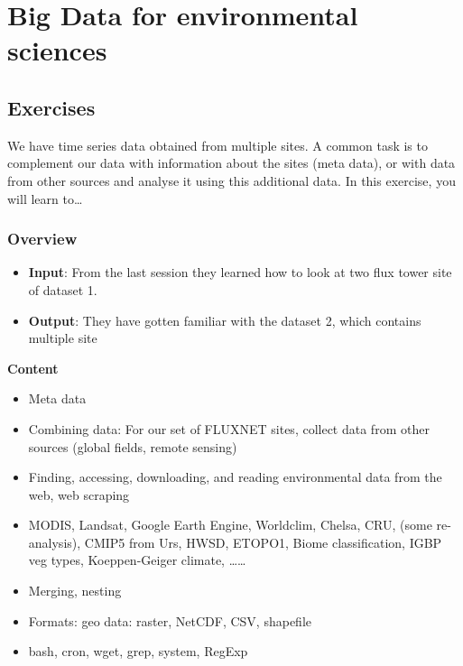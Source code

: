 \documentclass[]{book}
\providecommand{\tightlist}{%
  \setlength{\itemsep}{0pt}\setlength{\parskip}{0pt}}
\begin{document}
\hypertarget{big-data-for-environmental-sciences}{%
\chapter{Big Data for environmental sciences}\label{big-data-for-environmental-sciences}}

\hypertarget{exercises-1}{%
\section{Exercises}\label{exercises-1}}

We have time series data obtained from multiple sites. A common task is to complement our data with information about the sites (meta data), or with data from other sources and analyse it using this additional data. In this exercise, you will learn to\ldots{}

\hypertarget{overview-1}{%
\subsection{Overview}\label{overview-1}}

\begin{itemize}
\tightlist
\item
  \textbf{Input}: From the last session they learned how to look at two flux tower site of dataset 1.\\
\item
  \textbf{Output}: They have gotten familiar with the dataset 2, which contains multiple site
\end{itemize}

\textbf{Content}

\begin{itemize}
\tightlist
\item
  Meta data
\item
  Combining data: For our set of FLUXNET sites, collect data from other sources (global fields, remote sensing)
\item
  Finding, accessing, downloading, and reading environmental data from the web, web scraping
\item
  MODIS, Landsat, Google Earth Engine, Worldclim, Chelsa, CRU, (some re-analysis), CMIP5 from Urs, HWSD, ETOPO1, Biome classification, IGBP veg types, Koeppen-Geiger climate, \ldots{}\ldots{}
\item
  Merging, nesting
\item
  Formats: geo data: raster, NetCDF, CSV, shapefile
\item
  bash, cron, wget, grep, system, RegExp
\end{itemize}
\end{document}
